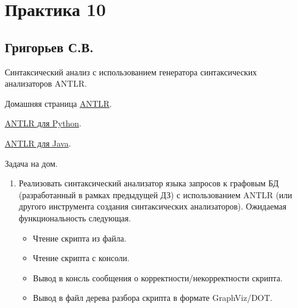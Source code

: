 \section{Практика 10}

\subsection{Григорьев С.В.}


Синтаксический анализ с использованием генератора синтаксических анализаторов ANTLR.

Домашняя страница \href{https://www.antlr.org/index.html}{ANTLR}.

\href{https://github.com/antlr/antlr4/blob/master/doc/python-target.md}{ANTLR для Python}.


\href{https://github.com/antlr/antlr4/blob/master/doc/java-target.md}{ANTLR для Java}.


Задача на дом.
\begin{enumerate}
  \item Реализовать синтаксический анализатор языка запросов к графовым БД (разработанный в рамках предыдущей ДЗ) с использованием ANTLR (или другого инструмента создания синтаксических анализаторов). Ожидаемая функциональность следующая.
  \begin{itemize}
  \item Чтение скрипта из файла.
  \item Чтение скрипта с консоли.
  \item Вывод в консль сообщения о корректности/некорректности скрипта.
  \item Вывод в файл дерева разбора скрипта в формате GraphViz/DOT.
  \end{itemize}
\end{enumerate}
